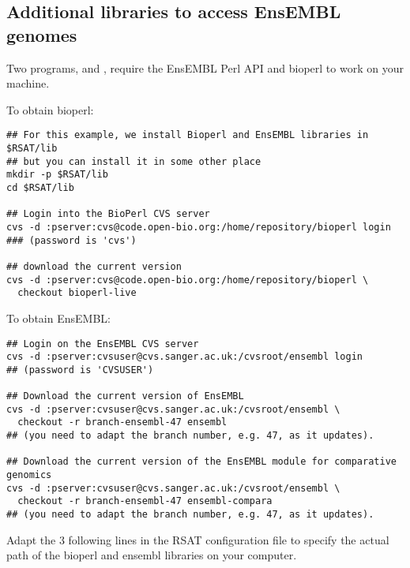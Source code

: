 \documentclass{book}
\begin{document}
\subsection{Additional libraries to access EnsEMBL genomes}

Two programs,  and
, require the EnsEMBL Perl API and
bioperl to work on your machine. 

To obtain bioperl:

\begin{footnotesize}
\begin{verbatim}
## For this example, we install Bioperl and EnsEMBL libraries in $RSAT/lib
## but you can install it in some other place
mkdir -p $RSAT/lib
cd $RSAT/lib

## Login into the BioPerl CVS server
cvs -d :pserver:cvs@code.open-bio.org:/home/repository/bioperl login
### (password is 'cvs')

## download the current version
cvs -d :pserver:cvs@code.open-bio.org:/home/repository/bioperl \
  checkout bioperl-live 

\end{verbatim}
\end{footnotesize}


To obtain EnsEMBL:

\begin{footnotesize}
\begin{verbatim}
## Login on the EnsEMBL CVS server
cvs -d :pserver:cvsuser@cvs.sanger.ac.uk:/cvsroot/ensembl login 
## (password is 'CVSUSER')

## Download the current version of EnsEMBL
cvs -d :pserver:cvsuser@cvs.sanger.ac.uk:/cvsroot/ensembl \
  checkout -r branch-ensembl-47 ensembl 
## (you need to adapt the branch number, e.g. 47, as it updates).

## Download the current version of the EnsEMBL module for comparative genomics
cvs -d :pserver:cvsuser@cvs.sanger.ac.uk:/cvsroot/ensembl \
  checkout -r branch-ensembl-47 ensembl-compara
## (you need to adapt the branch number, e.g. 47, as it updates).
\end{verbatim}
\end{footnotesize}

Adapt the 3 following lines in the RSAT configuration file
 to specify the actual path of the bioperl
and ensembl libraries on your computer.
\end{document}
